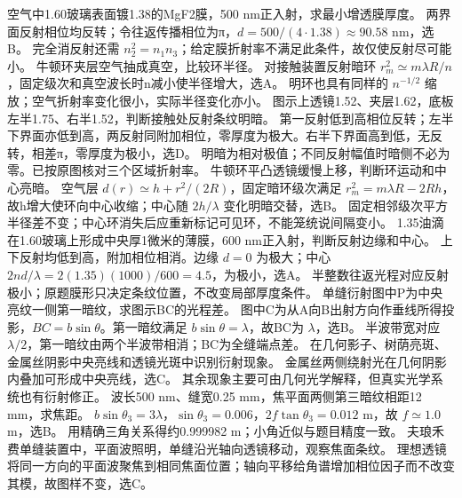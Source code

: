 \problemtext 空气中1.60玻璃表面镀1.38的MgF2膜，500 nm正入射，求最小增透膜厚度。
\workings 两界面反射相位均反转；令往返传播相位为π，$d=500/(4\cdot1.38)\approx90.58$ nm，选B。
\crosscheck 完全消反射还需 $n_2^2=n_1n_3$；给定膜折射率不满足此条件，故仅使反射尽可能小。
\problemtext 牛顿环夹层空气抽成真空，比较环半径。
\workings 对接触装置反射暗环 $r_m^2\simeq m\lambda R/n$，固定级次和真空波长时n减小使半径增大，选A。
\crosscheck 明环也具有同样的 $n^{-1/2}$ 缩放；空气折射率变化很小，实际半径变化亦小。
\problemtext 图示上透镜1.52、夹层1.62，底板左半1.75、右半1.52，判断接触处反射条纹明暗。
\workings 第一反射低到高相位反转；左半下界面亦低到高，两反射同附加相位，零厚度为极大。右半下界面高到低，无反转，相差π，零厚度为极小，选D。
\crosscheck 明暗为相对极值；不同反射幅值时暗侧不必为零。已按原图核对三个区域折射率。
\problemtext 牛顿环平凸透镜缓慢上移，判断环运动和中心亮暗。
\workings 空气层 $d(r)\simeq h+r^2/(2R)$，固定暗环级次满足 $r_m^2=m\lambda R-2Rh$，故h增大使环向中心收缩；中心随 $2h/\lambda$ 变化明暗交替，选B。
\crosscheck 固定相邻级次平方半径差不变；中心环消失后应重新标记可见环，不能笼统说间隔变小。
\problemtext 1.35油滴在1.60玻璃上形成中央厚1微米的薄膜，600 nm正入射，判断反射边缘和中心。
\workings 上下反射均低到高，附加相位相消。边缘 $d=0$ 为极大；中心 $2nd/\lambda=2(1.35)(1000)/600=4.5$，为极小，选A。
\crosscheck 半整数往返光程对应反射极小；原题膜形只决定条纹位置，不改变局部厚度条件。
\problemtext 单缝衍射图中P为中央亮纹一侧第一暗纹，求图示BC的光程差。
\workings 图中C为从A向B出射方向作垂线所得投影，$BC=b\sin\theta$。第一暗纹满足 $b\sin\theta=\lambda$，故BC为 $\lambda$，选B。
\crosscheck 半波带宽对应 $\lambda/2$，第一暗纹由两个半波带相消；BC为全缝端点差。
\problemtext 在几何影子、树荫亮斑、金属丝阴影中央亮线和透镜光斑中识别衍射现象。
\workings 金属丝两侧绕射光在几何阴影内叠加可形成中央亮线，选C。
\crosscheck 其余现象主要可由几何光学解释，但真实光学系统也有衍射修正。
\problemtext 波长500 nm、缝宽0.25 mm，焦平面两侧第三暗纹相距12 mm，求焦距。
\workings $b\sin\theta_3=3\lambda$，$\sin\theta_3=0.006$，$2f\tan\theta_3=0.012$ m，故 $f\simeq1.0$ m，选B。
\crosscheck 用精确三角关系得约0.999982 m；小角近似与题目精度一致。
\problemtext 夫琅禾费单缝装置中，平面波照明，单缝沿光轴向透镜移动，观察焦面条纹。
\workings 理想透镜将同一方向的平面波聚焦到相同焦面位置；轴向平移给角谱增加相位因子而不改变其模，故图样不变，选C。
